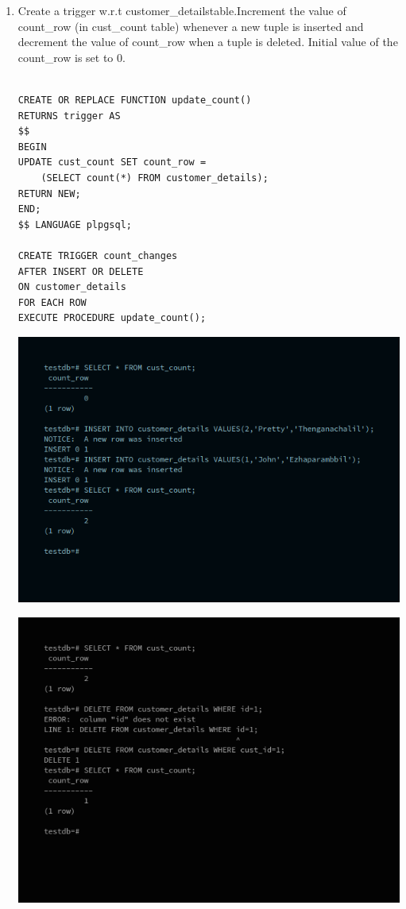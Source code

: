 \begin{enumerate}
\item Create a trigger w.r.t customer\_detailstable.Increment the value of count\_row (in cust\_count table) whenever a new tuple is inserted and decrement the value of count\_row when a tuple is deleted. Initial value of the count\_row is set to 0.
\begin{verbatim}

CREATE OR REPLACE FUNCTION update_count()
RETURNS trigger AS
$$
BEGIN
UPDATE cust_count SET count_row = 
	(SELECT count(*) FROM customer_details);
RETURN NEW;
END;
$$ LANGUAGE plpgsql;

CREATE TRIGGER count_changes
AFTER INSERT OR DELETE
ON customer_details
FOR EACH ROW
EXECUTE PROCEDURE update_count();

\end{verbatim}

\newline
\includegraphics[width=\linewidth]{../Images/Triggers/3.png}

\newline
\includegraphics[width=\linewidth]{../Images/Triggers/8.png}


\end{enumerate}
